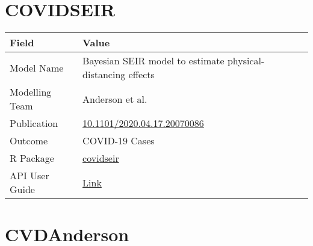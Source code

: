 \documentclass[
]{book}
\begin{document}
\hypertarget{covidseir}{%
\chapter{COVIDSEIR}\label{covidseir}}

\begin{longtable}[]{@{}ll@{}}
\toprule
Field & Value\tabularnewline
\midrule
\endhead
Model Name & Bayesian SEIR model to estimate physical-distancing effects\tabularnewline
Modelling Team & Anderson et al.\tabularnewline
Publication & \href{https://doi.org/10.1101/2020.04.17.20070086}{10.1101/2020.04.17.20070086}\tabularnewline
Outcome & COVID-19 Cases\tabularnewline
R Package & \href{https://github.com/seananderson/covidseir}{covidseir}\tabularnewline
API User Guide & \href{https://resplab.github.io/prismguide/api-users-guide.html\#covidseir}{Link}\tabularnewline
\bottomrule
\end{longtable}

\hypertarget{cvdanderson}{%
\chapter{CVDAnderson}\label{cvdanderson}}
\end{document}

